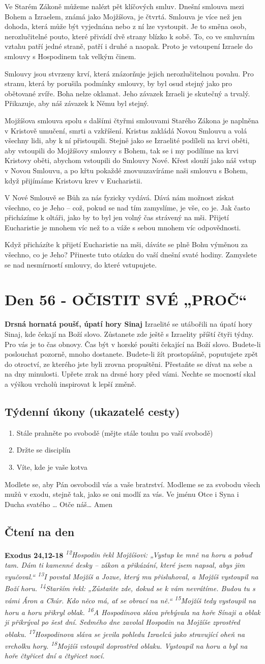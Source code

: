 \documentclass[11pt]{article}
\newcommand{\zacatekOsmyTyden}{
  \textbf{Drsná hornatá poušť, úpatí hory Sinaj} \newline 
  Izraelité se utábořili na úpatí hory Sinaj, kde čekají na Boží slovo. Zůstanete zde ještě s Izraelity příští čtyři týdny. Pro vás je to čas obnovy. Čas být v horské poušti čekající na Boží slovo. Budete-li poslouchat pozorně, mnoho dostanete. Budete-li žít prostopášně, poputujete zpět do otroctví, ze kterého jste byli zrovna propuštěni. Přestaňte se dívat na sebe a na dny minulosti. Upřete zrak na drsné hory před vámi. Nechte se mocností skal a výškou vrcholů inspirovat k lepší změně.
  \subsection*{Týdenní úkony (ukazatelé cesty)}
\begin{enumerate}
  \item Stále prahněte po svobodě (mějte stále touhu po vaší svobodě)
  \item Držte se disciplín
  \item Víte, kde je vaše kotva
\end{enumerate}
Modlete se, aby Pán osvobodil vás a vaše bratrství. \newline
Modleme se za svobodu všech mužů v exodu, stejně tak, jako se oni modlí za vás.\newline
Ve jménu Otce i Syna i Ducha svatého …  Otče náš… Amen
}
\begin{document}
Ve Starém Zákoně můžeme nalézt pět klíčových smluv. Dnešní smlouva mezi Bohem a Izraelem, známá
jako Mojžíšova, je čtvrtá. Smlouva je více než jen dohoda, která může být vyjednána nebo z ní lze vystoupit.
Je to směna osob, nerozlučitelné pouto, které přivádí dvě strany blízko k sobě. To, co ve smluvním vztahu
patří jedné straně, patří i druhé a naopak. Proto je vstoupení Izraele do smlouvy s Hospodinem tak velkým
činem.

Smlouvy jsou stvrzeny krví, která znázorňuje jejich nerozlučitelnou povahu. Pro stranu, která by porušila
podmínky smlouvy, by byl osud stejný jako pro obětované zvíře. Boha nelze oklamat. Jeho závazek Izraeli je
skutečný a trvalý. Přikazuje, aby náš závazek k Němu byl stejný.

Mojžíšova smlouva spolu s dalšími čtyřmi smlouvami Starého Zákona je naplněna v Kristově umučení, smrti
a vzkříšení. Kristus zakládá Novou Smlouvu a volá všechny lidi, aby k ní přistoupili. Stejně jako se Izraelité
podíleli na krvi oběti, aby vstoupili do Mojžíšovy smlouvy s Bohem, tak se i my podílíme na krvi Kristovy
oběti, abychom vstoupili do Smlouvy Nové. Křest slouží jako náš vstup v Novou Smlouvu, a po křtu
pokaždé znovuuzavíráme naši smlouvu s Bohem, když přijímáme Kristovu krev v Eucharistii.

V Nové Smlouvě se Bůh za nás fyzicky vydává. Dává nám možnost získat všechno, co je Jeho – což, pokud
se nad tím zamyslíme, je vše, co je. Jak často přicházíme k oltáři, jako by to byl jen volný čas strávený na
mši. Přijetí Eucharistie je mnohem víc než to a váže s sebou mnohem víc odpovědnosti.

Když přicházíte k přijetí Eucharistie na mši, dáváte se plně Bohu výměnou za všechno, co je Jeho? Přineste
tuto otázku do vaší dnešní svaté hodiny. Zamyslete se nad nesmírností smlouvy, do které vstupujete.

\newpage
\section{Den 56 - OČISTIT SVÉ „PROČ“ }
\zacatekOsmyTyden
\subsection*{Čtení na den}
\textbf{Exodus 24,12-18}
\newline
\textit{
\textsuperscript{12}Hospodin řekl Mojžíšovi: „Vystup ke mně na horu a pobuď tam. Dám ti kamenné desky – zákon a přikázání, které jsem napsal, abys jim vyučoval.“
\textsuperscript{13}I povstal Mojžíš a Jozue, který mu přisluhoval, a Mojžíš vystoupil na Boží horu.
\textsuperscript{14}Starším řekl: „Zůstaňte zde, dokud se k vám nevrátíme. Budou tu s vámi Áron a Chúr. Kdo něco má, ať se obrací na ně.“
\textsuperscript{15}Mojžíš tedy vystoupil na horu a horu přikryl oblak.
\textsuperscript{16}A Hospodinova sláva přebývala na hoře Sínaji a oblak ji přikrýval po šest dní. Sedmého dne zavolal Hospodin na Mojžíše zprostřed oblaku.
\textsuperscript{17}Hospodinova sláva se jevila pohledu Izraelců jako stravující oheň na vrcholku hory.
\textsuperscript{18}Mojžíš vstoupil doprostřed oblaku. Vystoupil na horu a byl na hoře čtyřicet dní a čtyřicet nocí.
}
\end{document}
